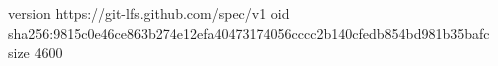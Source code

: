 version https://git-lfs.github.com/spec/v1
oid sha256:9815c0e46ce863b274e12efa40473174056cccc2b140cfedb854bd981b35bafc
size 4600
